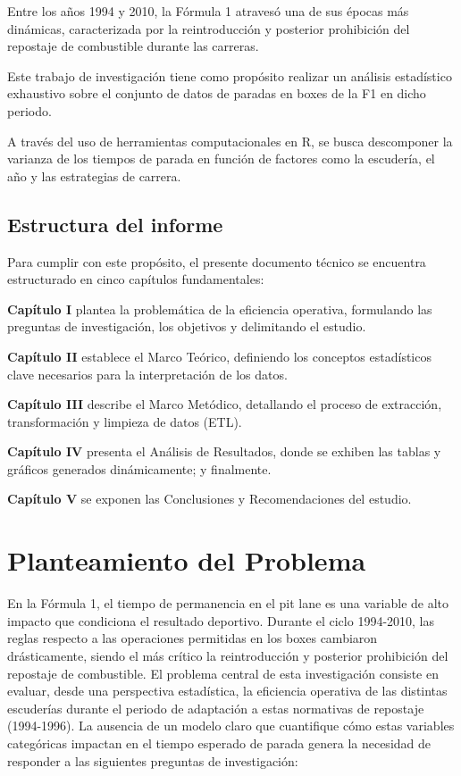 \documentclass[oneside,11pt]{Latex/Classes/PhDthesisPSnPDF}
\begin{document}
Entre los años 1994 y 2010, la Fórmula 1 atravesó una de sus épocas más
dinámicas, caracterizada por la reintroducción y posterior prohibición
del repostaje de combustible durante las carreras.

Este trabajo de investigación tiene como propósito realizar un análisis
estadístico exhaustivo sobre el conjunto de datos de paradas en boxes de
la F1 en dicho periodo.

A través del uso de herramientas computacionales en R, se busca
descomponer la varianza de los tiempos de parada en función de factores
como la escudería, el año y las estrategias de carrera.

\section{Estructura del informe}

Para cumplir con este propósito, el presente documento técnico se
encuentra estructurado en cinco capítulos fundamentales:

\textbf {Capítulo I} plantea la problemática de la eficiencia operativa,
formulando las preguntas de investigación, los objetivos y delimitando
el estudio.

\textbf {Capítulo II} establece el Marco Teórico, definiendo los
conceptos estadísticos clave necesarios para la interpretación de los
datos.

\textbf {Capítulo III} describe el Marco Metódico, detallando el proceso
de extracción, transformación y limpieza de datos (ETL).

\textbf {Capítulo IV} presenta el Análisis de Resultados, donde se
exhiben las tablas y gráficos generados dinámicamente; y finalmente.

\textbf {Capítulo V} se exponen las Conclusiones y Recomendaciones del
estudio.

\chapter{Planteamiento del Problema}

En la Fórmula 1, el tiempo de permanencia en el pit lane es una variable
de alto impacto que condiciona el resultado deportivo. Durante el ciclo
1994-2010, las reglas respecto a las operaciones permitidas en los boxes
cambiaron drásticamente, siendo el más crítico la reintroducción y
posterior prohibición del repostaje de combustible. El problema central
de esta investigación consiste en evaluar, desde una perspectiva
estadística, la eficiencia operativa de las distintas escuderías durante
el periodo de adaptación a estas normativas de repostaje (1994-1996). La
ausencia de un modelo claro que cuantifique cómo estas variables
categóricas impactan en el tiempo esperado de parada genera la necesidad
de responder a las siguientes preguntas de investigación:
\end{document}

